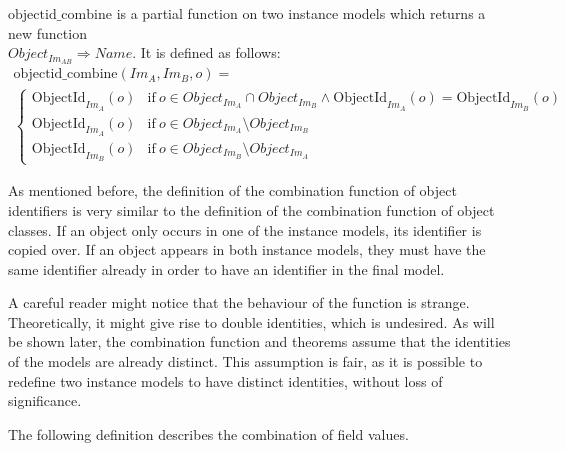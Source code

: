 \begin{defin}
\label{defin:transformation_framework:instance_models_and_instance_graphs:combining_instance_models:objectid_combine}
$\mathrm{objectid\_\!combine}$ is a partial function on two instance models which returns a new function \\$Object_{Im_{AB}} \Rightarrow Name$. It is defined as follows:
\begin{multline*}
    \mathrm{objectid\_\!combine}(Im_{A}, Im_{B}, o) = \\
        \begin{cases}
        \mathrm{ObjectId}_{Im_A}(o) & \mathrm{if }\ o \in Object_{Im_A} \cap Object_{Im_B} \land \mathrm{ObjectId}_{Im_A}(o) = \mathrm{ObjectId}_{Im_B}(o) \\
        \mathrm{ObjectId}_{Im_A}(o) & \mathrm{if }\ o \in Object_{Im_A} \setminus Object_{Im_B} \\
        \mathrm{ObjectId}_{Im_B}(o) & \mathrm{if }\ o \in Object_{Im_B} \setminus Object_{Im_A}
    \end{cases}
\end{multline*}
\end{defin}

As mentioned before, the definition of the combination function of object identifiers is very similar to the definition of the combination function of object classes. If an object only occurs in one of the instance models, its identifier is copied over. If an object appears in both instance models, they must have the same identifier already in order to have an identifier in the final model.

A careful reader might notice that the behaviour of the function is strange. Theoretically, it might give rise to double identities, which is undesired. As will be shown later, the combination function and theorems assume that the identities of the models are already distinct. This assumption is fair, as it is possible to redefine two instance models to have distinct identities, without loss of significance.

The following definition describes the combination of field values.

